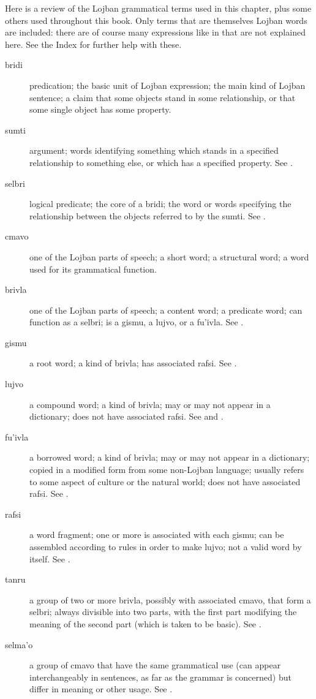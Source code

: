 Here is a review of the Lojban grammatical terms used in this chapter, plus some others used throughout this book. Only terms that are themselves Lojban words are included: there are of course many expressions like  in  that are not explained here. See the Index for further help with these.
\begin{description}
\item[bridi] predication; the basic unit of Lojban expression; the main kind of Lojban sentence; a claim that some objects stand in some relationship, or that some single object has some property.
\item[sumti] argument; words identifying something which stands in a specified relationship to something else, or which has a specified property. See .
\item[selbri] logical predicate; the core of a bridi; the word or words specifying the relationship between the objects referred to by the sumti. See .
\item[cmavo] one of the Lojban parts of speech; a short word; a structural word; a word used for its grammatical function.
\item[brivla] one of the Lojban parts of speech; a content word; a predicate word; can function as a selbri; is a gismu, a lujvo, or a fu'ivla. See .
\item[gismu] a root word; a kind of brivla; has associated rafsi. See .
\item[lujvo] a compound word; a kind of brivla; may or may not appear in a dictionary; does not have associated rafsi. See and .
\item[fu'ivla] a borrowed word; a kind of brivla; may or may not appear in a dictionary; copied in a modified form from some non-Lojban language; usually refers to some aspect of culture or the natural world; does not have associated rafsi. See .
\item[rafsi] a word fragment; one or more is associated with each gismu; can be assembled according to rules in order to make lujvo; not a valid word by itself. See .
\item[tanru] a group of two or more brivla, possibly with associated cmavo, that form a selbri; always divisible into two parts, with the first part modifying the meaning of the second part (which is taken to be basic). See .
\item[selma'o] a group of cmavo that have the same grammatical use (can appear interchangeably in sentences, as far as the grammar is concerned) but differ in meaning or other usage. See .
\end{description}

